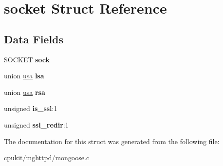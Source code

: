 \hypertarget{structsocket}{}\section{socket Struct Reference}
\label{structsocket}
\subsection*{Data Fields}
\begin{DoxyCompactItemize}
\item 
\mbox{\label{structsocket_ace41176c1363c25e08837812c18d22dd}} 
S\+O\+C\+K\+ET {\bfseries sock}
\item 
\mbox{\label{structsocket_a455153d6b0bf7dd4af9ce0183ab35a00}} 
union \mbox{\hyperlink{unionusa}{usa}} {\bfseries lsa}
\item 
\mbox{\label{structsocket_afe3a45fe832ca19cc85299b9a96d8feb}} 
union \mbox{\hyperlink{unionusa}{usa}} {\bfseries rsa}
\item 
\mbox{\label{structsocket_aa8152c54701b2335686bf6340c6d66f9}} 
unsigned {\bfseries is\+\_\+ssl}\+:1
\item 
\mbox{\label{structsocket_a8b240da0ea196db6506b8090a7b2606a}} 
unsigned {\bfseries ssl\+\_\+redir}\+:1
\end{DoxyCompactItemize}


The documentation for this struct was generated from the following file\+:\begin{DoxyCompactItemize}
\item 
cpukit/mghttpd/mongoose.\+c\end{DoxyCompactItemize}
